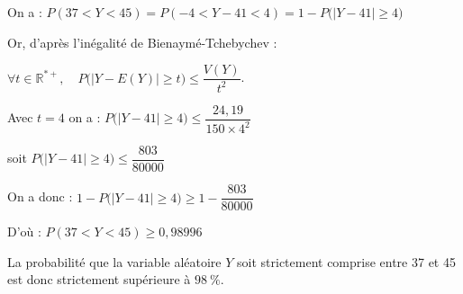 \documentclass[10pt]{article}
\providecommand{\R}{\mathbb{R}}
\begin{document}
On a  : $P(37<Y<45) = P(-4< Y-41<4) = 1- P\Big(\big|Y-41\big| \geq 4\Big)$

Or, d'après l'inégalité de Bienaymé-Tchebychev :

$\forall t \in \R^{*+}, \quad P\Big(\big|Y - E(Y)\big| \geq t\Big) \leq  \dfrac{V(Y)}{t^2 } $.

Avec $t= 4$  on  a : $P\Big(\big|Y- 41\big| \geq 4\Big) \leq  \dfrac{24,19}{150 \times 4^2 } $

soit  $ P\Big(\big|Y-41\big| \geq 4\Big) \leq \dfrac{ 803}{80000}$

On a donc :  $1- P\Big(\big|Y-41\big| \geq 4\Big) \geq 1- \dfrac{ 803}{80000}$

D'où : $P(37<Y<45) \geq 0,98996$


La probabilité que la variable aléatoire $Y$ soit strictement comprise entre 37 et 45 est donc strictement supérieure à $98~\%$.
\end{document}
